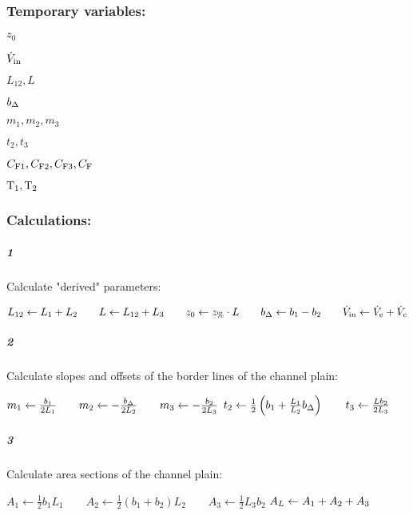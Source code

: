 \subsubsection*{Temporary variables:}
\begin{multicols}{3}
  \begin{packed_item}
  \item $z_0$
  \item $\dot{V}_\text{in}$
  \item $L_{12}, L$  
  \item $b_\Delta$
  \item $m_1, m_2, m_3$
  \item $t_2, t_3$
  \item $C_\text{F1}, C_\text{F2}, C_\text{F3}, C_\text{F}$
 \item $\text{T}_{1}, \text{T}_{2}$
  \end{packed_item}
\end{multicols}
\subsubsection*{Calculations:}
\subparagraph{1}
Calculate "derived" parameters:
\begin{algorithmic}
\State $L_{12} \leftarrow L_1 + L_2
        \qquad L \leftarrow L_{12} + L_3
        \qquad z_0 \leftarrow z_\text{\%} \cdot L
        \qquad b_\Delta \leftarrow  b_1 - b_2
        \qquad \dot{V}_\text{in} \leftarrow \dot{V}_\text{e} + \dot{V}_\text{c}
        $
\end{algorithmic}
\subparagraph{2}
Calculate slopes and offsets of the border lines of the channel plain:
\begin{algorithmic}
  \State $       m_1 \leftarrow   \frac{b_1}{2L_1}
          \qquad m_2 \leftarrow - \frac{b_\Delta}{2L_2}
          \qquad m_3 \leftarrow - \frac{b_2}{2L_3}
         $\vspace*{.5ex}
  \State $           t_2 \leftarrow \frac{1}{2} \left( b_1 +  \frac{L_1}{L_2}b_\Delta \right)
              \qquad t_3 \leftarrow \frac{L b_2}{2 L_3 }
         $\vspace*{.5ex}
\end{algorithmic}
\subparagraph{3}
Calculate area sections of the channel plain:
\begin{algorithmic}
  \State $       A_1 \leftarrow \frac{1}{2} b_1  L_1  
          \qquad A_2 \leftarrow  \frac{1}{2} (b_1 + b_2) L_2  
          \qquad A_3 \leftarrow \frac{1}{2} L_3b_2  
         $\vspace*{.5ex}
  \State $  A_L \leftarrow A_1 + A_2 + A_3
  $\vspace*{.5ex}
\end{algorithmic}

